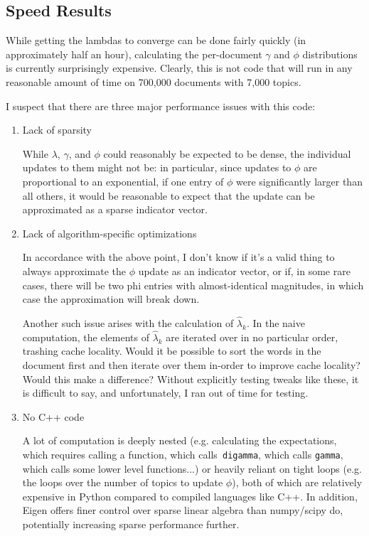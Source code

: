 \documentclass{article}
\begin{document}
\subsection{Speed Results}

While getting the lambdas to converge can be done fairly quickly (in
approximately half an hour), calculating the per-document $\gamma$ and $\phi$
distributions is currently surprisingly expensive. Clearly, this is not code
that will run in any reasonable amount of time on 700,000 documents with 7,000
topics.

I suspect that there are three major performance issues with this code:

\begin{enumerate}
\item Lack of sparsity

  While $\lambda$, $\gamma$, and $\phi$ could reasonably be expected to be
  dense, the individual updates to them might not be: in particular, since
  updates to $\phi$ are proportional to an exponential, if one entry of $\phi$
  were significantly larger than all others, it would be reasonable to expect
  that the update can be approximated as a sparse indicator vector.
\item Lack of algorithm-specific optimizations

  In accordance with the above point, I don't know if it's a valid thing to
  always approximate the $\phi$ update as an indicator vector, or if, in some
  rare cases, there will be two phi entries with almost-identical magnitudes, in
  which case the approximation will break down.

  Another such issue arises with the calculation of $\hat{\lambda}_k$. In the
  naive computation, the elements of $\hat{\lambda}_k$ are iterated over in no
  particular order, trashing cache locality. Would it be possible to sort the
  words in the document first and then iterate over them in-order to improve
  cache locality? Would this make a difference? Without explicitly testing
  tweaks like these, it is difficult to say, and unfortunately, I ran out of
  time for testing.

\item No C++ code

  A lot of computation is deeply nested (e.g. calculating the expectations,
  which requires calling a function, which calls\texttt{ digamma}, which calls
 \texttt{gamma}, which calls some lower level functions...) or heavily reliant
 on tight loops (e.g. the loops over the number of topics to update $\phi$),
 both of which are relatively expensive in Python compared to compiled languages
 like C++. In addition, Eigen offers finer control over sparse linear algebra
 than numpy/scipy do, potentially increasing sparse performance further.
  
\end{enumerate}
\end{document}
